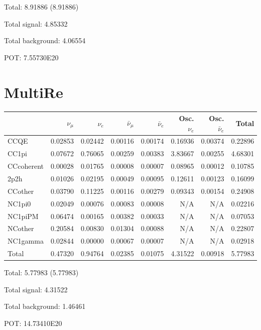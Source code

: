 \documentclass[10pt,a4paper]{article}
\begin{document}
Total: 8.91886    (8.91886)


Total signal: 4.85332


Total background: 4.06554

POT: 7.55730E20



\clearpage


\section*{MultiRe}
\begin{tabular} { | l ||r | r | r | r | r | r | | r | }
\hline
              & $\nu_\mu$            & $\nu_e$              & $\bar{\nu}_{\mu}$    & $\bar{\nu}_{e}$      & Osc. $\nu_e$         & Osc. $\bar{\nu}_{e}$ & Total                \\ \hline\hline
 CCQE         & 0.02853              & 0.02442              & 0.00116              & 0.00174              & 0.16936              & 0.00374              & 0.22896              \\ \hline
 CC1pi        & 0.07672              & 0.76065              & 0.00259              & 0.00383              & 3.83667              & 0.00255              & 4.68301              \\ \hline
 CCcoherent   & 0.00028              & 0.01765              & 0.00008              & 0.00007              & 0.08965              & 0.00012              & 0.10785              \\ \hline
 2p2h         & 0.01026              & 0.02195              & 0.00049              & 0.00095              & 0.12611              & 0.00123              & 0.16099              \\ \hline
 CCother      & 0.03790              & 0.11225              & 0.00116              & 0.00279              & 0.09343              & 0.00154              & 0.24908              \\ \hline
 NC1pi0       & 0.02049              & 0.00076              & 0.00083              & 0.00008              & N/A                  & N/A                  & 0.02216              \\ \hline
 NC1piPM      & 0.06474              & 0.00165              & 0.00382              & 0.00033              & N/A                  & N/A                  & 0.07053              \\ \hline
 NCother      & 0.20584              & 0.00830              & 0.01304              & 0.00088              & N/A                  & N/A                  & 0.22807              \\ \hline
 NC1gamma     & 0.02844              & 0.00000              & 0.00067              & 0.00007              & N/A                  & N/A                  & 0.02918              \\ \hline
\hline
 Total        & 0.47320              & 0.94764              & 0.02385              & 0.01075              & 4.31522              & 0.00918              & 5.77983              \\ \hline

\end{tabular}

Total: 5.77983    (5.77983)


Total signal: 4.31522


Total background: 1.46461

POT: 14.73410E20
\end{document}
